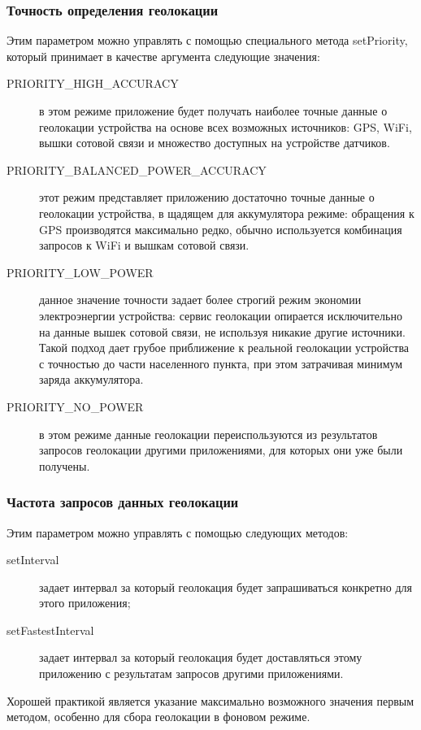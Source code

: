 \subsubsection*{Точность определения геолокации}
Этим параметром можно управлять с помощью специального метода setPriority, который принимает в качестве аргумента следующие значения:
\begin{description}
	\item[PRIORITY\_HIGH\_ACCURACY] в этом режиме приложение будет получать наиболее точные данные о геолокации устройства на основе всех возможных источников: GPS, WiFi, вышки сотовой связи и множество доступных на устройстве датчиков.
	\item[PRIORITY\_BALANCED\_POWER\_ACCURACY] этот режим представляет приложению достаточно точные данные о геолокации устройства, в щадящем для аккумулятора режиме: обращения к GPS производятся максимально редко, обычно используется комбинация запросов к WiFi и вышкам сотовой связи.
	\item[PRIORITY\_LOW\_POWER] данное значение точности задает более строгий режим экономии электроэнергии устройства: сервис геолокации опирается исключительно на данные вышек сотовой связи, не используя никакие другие источники. Такой подход дает грубое приближение к реальной геолокации устройства с точностью до части населенного пункта, при этом затрачивая минимум заряда аккумулятора.
	\item[PRIORITY\_NO\_POWER] в этом режиме данные геолокации переиспользуются из результатов запросов геолокации другими приложениями, для которых они уже были получены.
\end{description}


\subsubsection*{Частота запросов данных геолокации}
Этим параметром можно управлять с помощью следующих методов:
\begin{description}
	\item[setInterval] задает интервал за который геолокация будет запрашиваться конкретно для этого приложения;
	\item[setFastestInterval] задает интервал за который геолокация будет доставляться этому приложению с результатам запросов другими приложениями.
\end{description}
\smallskip
Хорошей практикой является указание максимально возможного значения первым методом, особенно для сбора геолокации в фоновом режиме.


